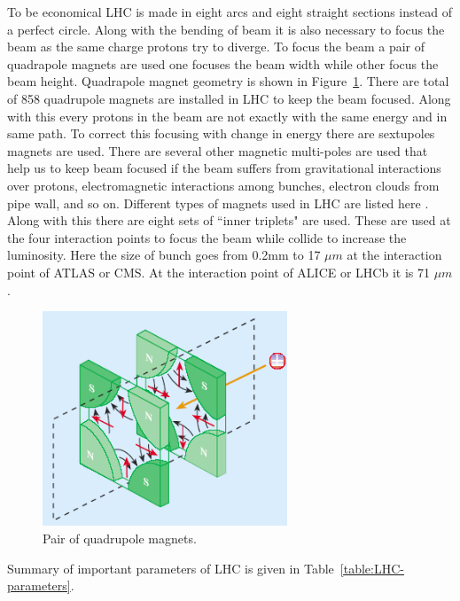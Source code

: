 To be economical LHC is made in eight arcs and eight straight sections instead of a perfect circle. Along with the bending of beam it is also necessary to focus the beam as the same charge protons try to diverge. To focus the beam a pair of quadrapole magnets are used one focuses the beam width while other focus the beam height. Quadrapole magnet geometry is shown in Figure~\ref{fig:QuadrupoleMagnet}. There are total of 858 quadrupole magnets are installed in LHC to keep the beam focused. Along with this every protons in the beam are not exactly with the same energy and in same path. To correct this focusing with change in energy there are sextupoles magnets are used. There are several other magnetic multi-poles are used that help us to keep beam focused if the beam suffers from gravitational interactions over protons, electromagnetic interactions among bunches, electron clouds from pipe wall, and so on. Different types of magnets used in LHC are listed here \cite{WebLink:LHC_magnets}. Along with this there are eight sets of ``inner triplets" are used. These are used at the four interaction points to focus the beam while collide to increase the luminosity. Here the size of bunch goes from 0.2mm to 17 $\mu m$ at the interaction point of ATLAS or CMS. At the interaction point of ALICE or LHCb it is 71 $\mu m$.
\begin{figure}[!htbp]
	\centering
	\includegraphics[width=0.65\textwidth]{figures/LHC/quadrupole_magnet_pair.png}
	\caption{Pair of quadrupole magnets.}
	\label{fig:QuadrupoleMagnet}
\end{figure}


Summary of important parameters of LHC is given in Table~\ref{table:LHC-parameters}.

